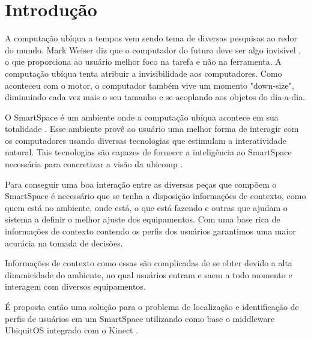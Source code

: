 \textual

\chapter{Introdução}
	
A computação ubíqua a tempos vem sendo tema de diversas pesquisas ao redor do mundo. Mark Weiser diz que o computador do futuro deve ser algo invisível \cite{weiser1} \cite{weiser2}, o que proporciona ao usuário melhor foco na tarefa e não na ferramenta. A computação ubíqua tenta atribuir a invisibilidade aos computadores. Como aconteceu com o motor, o computador também vive um momento "down-size", diminuindo cada vez mais o seu tamanho e se acoplando aos objetos do dia-a-dia.

O SmartSpace é um ambiente onde a computação ubíqua acontece em sua totalidade \cite{gregoryabowd}. Esse ambiente provê ao usuário uma melhor forma de interagir com os computadores usando diversas tecnologias que estimulam a interatividade natural. Tais tecnologias são capazes de fornecer a inteligência ao SmartSpace necessária para concretizar a visão da ubicomp \cite{fabriciobuzzeto}.

Para conseguir uma boa interação entre as diversas peças que compõem o SmartSpace é necessário que se tenha a disposição informações de contexto,  como quem está no ambiente, onde está, o que está fazendo e outras que ajudam o sistema a definir o melhor ajuste dos equipamentos. Com uma base rica de informações de contexto contendo os perfis dos usuários garantimos uma maior acurácia na tomada de decisões. 

Informações de contexto como essas são complicadas de se obter devido a alta dinamicidade do ambiente, no qual usuários entram e saem a todo momento e interagem com diversos equipamentos.

É proposta então uma solução para o problema de localização e identificação de perfis de usuários em um SmartSpace utilizando como base o middleware UbiquitOS \cite{alegomes} integrado com o Kinect \cite{kinecturl}.

